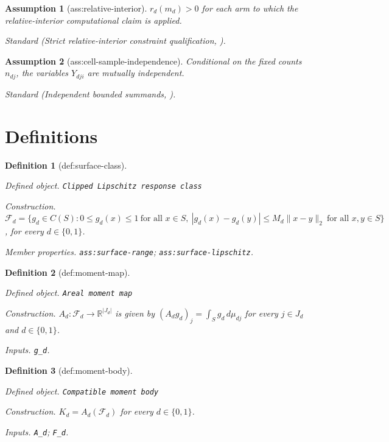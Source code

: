 \documentclass{article}
\newtheorem{assumption}{Assumption}
\newtheorem{definition}{Definition}
\begin{document}
\begin{assumption}[ass:relative-interior]\label{ass:relative-interior}
\(r_d(m_d)>0\) for each arm to which the relative-interior computational claim is applied.
\par\smallskip\noindent\emph{Standard} (Strict relative-interior constraint qualification, \cite{KaidoMolinariStoye2022ConstraintQualifications}).
\end{assumption}

\begin{assumption}[ass:cell-sample-independence]\label{ass:cell-sample-independence}
Conditional on the fixed counts \(n_{dj}\), the variables \(Y_{dji}\) are mutually independent.
\par\smallskip\noindent\emph{Standard} (Independent bounded summands, \cite{Hoeffding1963ProbabilityInequalities}).
\end{assumption}

\section{Definitions}

\begin{definition}[def:surface-class]\label{def:surface-class}
\par\smallskip\noindent\emph{Defined object.} \texttt{Clipped Lipschitz response class}
\par\smallskip\noindent\emph{Construction.} \(\mathcal F_d=\{g_d\in C(S):0\le g_d(x)\le1\ \text{for all }x\in S,\ |g_d(x)-g_d(y)|\le M_d\|x-y\|_2\ \text{for all }x,y\in S\}\), for every \(d\in\{0,1\}\).
\par\smallskip\noindent\emph{Member properties.} \texttt{ass:\allowbreak{}surface-\allowbreak{}range}; \texttt{ass:\allowbreak{}surface-\allowbreak{}lipschitz}.
\end{definition}

\begin{definition}[def:moment-map]\label{def:moment-map}
\par\smallskip\noindent\emph{Defined object.} \texttt{Areal moment map}
\par\smallskip\noindent\emph{Construction.} \(A_d:\mathcal F_d\to\mathbb R^{|J_d|}\) is given by \((A_dg_d)_j=\int_Sg_d\,d\mu_{dj}\) for every \(j\in J_d\) and \(d\in\{0,1\}\).
\par\smallskip\noindent\emph{Inputs.} \texttt{g\_\allowbreak{}d}.
\end{definition}

\begin{definition}[def:moment-body]\label{def:moment-body}
\par\smallskip\noindent\emph{Defined object.} \texttt{Compatible moment body}
\par\smallskip\noindent\emph{Construction.} \(K_d=A_d(\mathcal F_d)\) for every \(d\in\{0,1\}\).
\par\smallskip\noindent\emph{Inputs.} \texttt{A\_\allowbreak{}d}; \texttt{F\_\allowbreak{}d}.
\end{definition}
\end{document}
